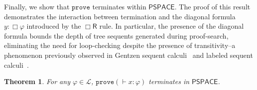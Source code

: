 \documentclass[copyright,creativecommons]{eptcs}
\newtheorem{theorem}{Theorem}[section]
\newcommand{\tel}{\mathcal{T}}
\newcommand{\boxr}{\Box\mathsf{R}}
\newcommand{\fourru}{\mathsf{4L}}
\renewcommand{\phi}{\varphi}
\newcommand{\lang}{\mathscr{L}}
\newcommand{\sar}{\vdash}
\newcommand{\tseq}{T} %
\newcommand{\prove}{\mathtt{prove}}
\newcommand{\ndrule}{\Box_\mathsf{DB}}
\newcommand{\pspace}{\mathsf{PSPACE}}
\begin{document}
Finally, we show that $\prove$ terminates within $\pspace$. The proof of this result demonstrates the interaction between termination and the diagonal formula $y : \Box \phi$ introduced by the $\boxr$ rule. In particular, the presence of the diagonal formula bounds the depth of tree sequents generated during proof-search, eliminating the need for loop-checking despite the presence of transitivity--a phenomenon previously observed in Gentzen sequent calculi~\cite{SamVal80} and labeled sequent calculi~\cite{Neg14}. %




\begin{theorem}\label{thm:termination}
For any $\phi \in \lang$, $\prove(\sar x : \phi)$ terminates in $\pspace$.
\end{theorem}
\end{document}
